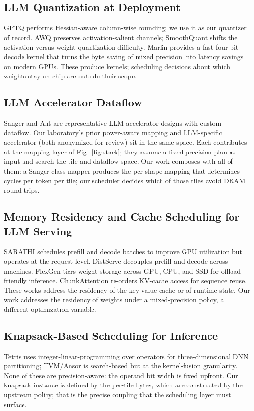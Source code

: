 \documentclass{ieeeaccess}
\begin{document}
\subsection{LLM Quantization at Deployment}
GPTQ \cite{frantar2023gptq} performs Hessian-aware column-wise
rounding; we use it as our quantizer of record. AWQ
\cite{lin2024awq} preserves activation-salient channels;
SmoothQuant \cite{xiao2023smoothquant} shifts the
activation-versus-weight quantization difficulty. Marlin
\cite{frantar2024marlin} provides a fast four-bit decode kernel that
turns the byte saving of mixed precision into latency savings on
modern GPUs. These produce kernels; scheduling decisions about which
weights stay on chip are outside their scope.

\subsection{LLM Accelerator Dataflow}
Sanger \cite{lu2021sanger} and Ant \cite{guo2022ant} are representative
LLM accelerator designs with custom dataflow. Our laboratory's prior
power-aware mapping and LLM-specific accelerator (both anonymized for
review) sit in the same space. Each contributes at the mapping layer
of Fig.~\ref{fig:stack}; they assume a fixed precision plan as input
and search the tile and dataflow space. Our work composes with all of
them: a Sanger-class mapper produces the per-shape mapping that
determines cycles per token per tile; our scheduler decides which of
those tiles avoid DRAM round trips.

\subsection{Memory Residency and Cache Scheduling for LLM Serving}
SARATHI \cite{agrawal2024sarathi} schedules prefill and decode batches
to improve GPU utilization but operates at the request level.
DistServe \cite{zhong2024distserve} decouples prefill and decode
across machines. FlexGen \cite{sheng2023flexgen} tiers weight storage
across GPU, CPU, and SSD for offload-friendly inference.
ChunkAttention \cite{ye2024chunkattention} re-orders KV-cache access
for sequence reuse. These works address the residency of the
key-value cache or of runtime state. Our work addresses the residency
of weights under a mixed-precision policy, a different optimization
variable.

\subsection{Knapsack-Based Scheduling for Inference}
Tetris \cite{gao2017tetris} uses integer-linear-programming over
operators for three-dimensional DNN partitioning; TVM/Ansor
\cite{zheng2020ansor} is search-based but at the kernel-fusion
granularity. None of these are precision-aware: the operand bit width
is fixed upfront. Our knapsack instance is defined by the per-tile
bytes, which are constructed by the upstream policy; that is the
precise coupling that the scheduling layer must surface.
\end{document}
